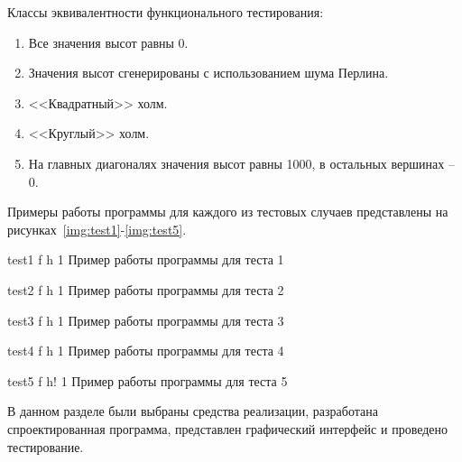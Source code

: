 Классы эквивалентности функционального тестирования:

\begin{enumerate}[label=\arabic*.]
	\item Все значения высот равны 0.
	\item Значения высот сгенерированы с использованием шума Перлина.
	\item <<Квадратный>> холм.
	\item <<Круглый>> холм.
	\item На главных диагоналях значения высот равны 1000, в остальных вершинах -- 0.
\end{enumerate}

Примеры работы программы для каждого из тестовых случаев представлены на рисунках~\ref{img:test1}-\ref{img:test5}.

\FloatBarrier
{}
{test1} %
{f} %
{h} %
{1\textwidth} %
{Пример работы программы для теста 1} %
\FloatBarrier

\FloatBarrier
{}
{test2} %
{f} %
{h} %
{1\textwidth} %
{Пример работы программы для теста 2} %
\FloatBarrier

\FloatBarrier
{}
{test3} %
{f} %
{h} %
{1\textwidth} %
{Пример работы программы для теста 3} %
\FloatBarrier

\FloatBarrier
{}
{test4} %
{f} %
{h} %
{1\textwidth} %
{Пример работы программы для теста 4} %
\FloatBarrier

\FloatBarrier
{}
{test5} %
{f} %
{h!} %
{1\textwidth} %
{Пример работы программы для теста 5} %
\FloatBarrier


В данном разделе были выбраны средства реализации, разработана спроектированная программа, представлен графический интерфейс и проведено тестирование.